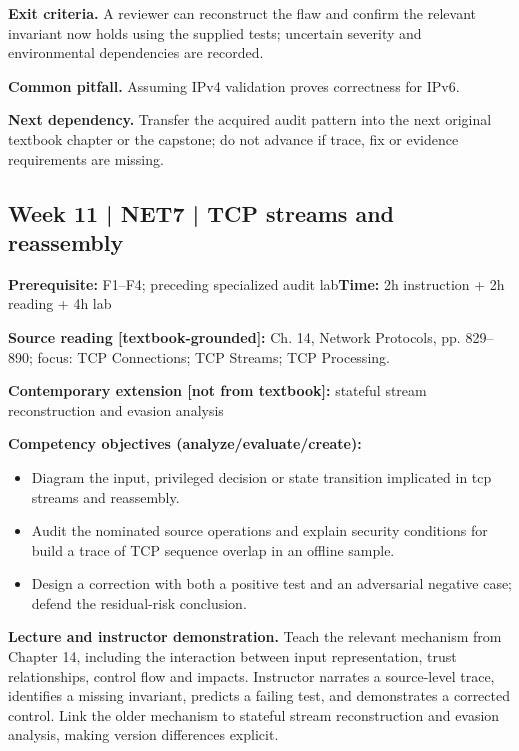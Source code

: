 \documentclass[10pt,letterpaper]{article}
\begin{document}
\textbf{Exit criteria.} A reviewer can reconstruct the flaw and confirm the relevant invariant now holds using the supplied tests; uncertain severity and environmental dependencies are recorded.

\textbf{Common pitfall.} Assuming IPv4 validation proves correctness for IPv6.

\textbf{Next dependency.} Transfer the acquired audit pattern into the next original textbook chapter or the capstone; do not advance if trace, fix or evidence requirements are missing.

\subsection{Week 11 | NET7 | TCP streams and reassembly}
\textbf{Prerequisite:} F1--F4; preceding specialized audit lab\hfill\textbf{Time:} 2h instruction + 2h reading + 4h lab

\textbf{Source reading [textbook-grounded]:} Ch. 14, Network Protocols, pp. 829--890; focus: TCP Connections; TCP Streams; TCP Processing.

\textbf{Contemporary extension [not from textbook]:} stateful stream reconstruction and evasion analysis

\textbf{Competency objectives (analyze/evaluate/create):}
\begin{itemize}[leftmargin=*,itemsep=2pt]
\item Diagram the input, privileged decision or state transition implicated in tcp streams and reassembly.
\item Audit the nominated source operations and explain security conditions for build a trace of TCP sequence overlap in an offline sample.
\item Design a correction with both a positive test and an adversarial negative case; defend the residual-risk conclusion.
\end{itemize}
\textbf{Lecture and instructor demonstration.} Teach the relevant mechanism from Chapter 14, including the interaction between input representation, trust relationships, control flow and impacts. Instructor narrates a source-level trace, identifies a missing invariant, predicts a failing test, and demonstrates a corrected control. Link the older mechanism to stateful stream reconstruction and evasion analysis, making version differences explicit.
\end{document}
